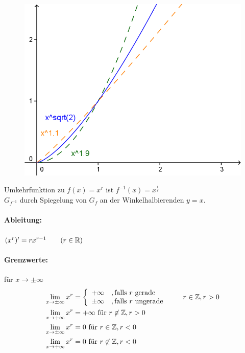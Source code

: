 \begin{enumerate}[A)]
\begin{figure}[h!]
		\begin{minipage}{0.49\linewidth}
			\centering \includegraphics[width=0.9\linewidth]{Bilder/165}
			\caption{}
		\end{minipage}
	\end{figure}
\end{enumerate}

\clearpage
\begin{minipage}{\linewidth}
	Umkehrfunktion zu $f(x)=x^r$ ist $f^{-1}(x)=x^{\frac{1}{r}}$\\
	$G_{f^{-1}}$ durch Spiegelung von $G_{f}$ an der Winkelhalbierenden $y=x$.
	
	\paragraph{Ableitung:} $(x^r)' = rx^{r-1}\qquad(r\in\mathbb{R})$
	
	\paragraph{Grenzwerte:} für $x\to\pm\infty$
	\begin{align*}
	\lim\limits_{x\to\pm\infty}x^r&=\left\{\begin{array}{ll}+\infty&,\text{falls }r\text{ gerade}\\\pm\infty&,\text{falls }r\text{ ungerade}\end{array}\right.\qquad r\in\mathbb{Z}, r>0\\
	\lim\limits_{x\to+\infty}x^r&=+\infty\text{ für }r\not\in\mathbb{Z},r>0\\
	\lim\limits_{x\to\pm\infty}x^r&=0\text{ für }r\in\mathbb{Z}, r<0\\
	\lim\limits_{x\to+\infty}x^r&=0\text{ für }r\not\in\mathbb{Z},r<0\\
	\end{align*}
\end{minipage}

